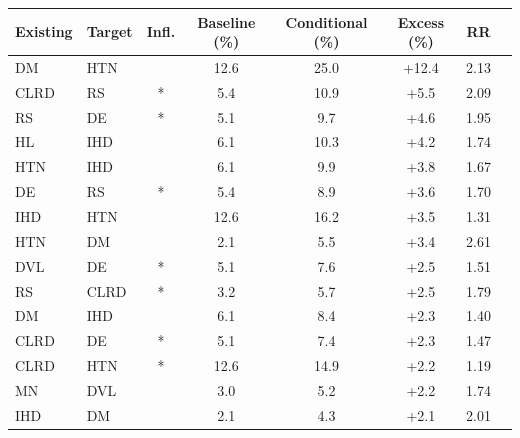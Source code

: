 \begin{tabular}{llcccccc}
\toprule
\textbf{Existing} & \textbf{Target} & \textbf{Infl.} & \textbf{Baseline (\%)} & \textbf{Conditional (\%)} & \textbf{Excess (\%)} & \textbf{RR} \\
\midrule
DM & HTN &  & 12.6 & 25.0 & +12.4 & 2.13 \\
CLRD & RS & * & 5.4 & 10.9 & +5.5 & 2.09 \\
RS & DE & * & 5.1 & 9.7 & +4.6 & 1.95 \\
HL & IHD &  & 6.1 & 10.3 & +4.2 & 1.74 \\
HTN & IHD &  & 6.1 & 9.9 & +3.8 & 1.67 \\
DE & RS & * & 5.4 & 8.9 & +3.6 & 1.70 \\
IHD & HTN &  & 12.6 & 16.2 & +3.5 & 1.31 \\
HTN & DM &  & 2.1 & 5.5 & +3.4 & 2.61 \\
DVL & DE & * & 5.1 & 7.6 & +2.5 & 1.51 \\
RS & CLRD & * & 3.2 & 5.7 & +2.5 & 1.79 \\
DM & IHD &  & 6.1 & 8.4 & +2.3 & 1.40 \\
CLRD & DE & * & 5.1 & 7.4 & +2.3 & 1.47 \\
CLRD & HTN & * & 12.6 & 14.9 & +2.2 & 1.19 \\
MN & DVL &  & 3.0 & 5.2 & +2.2 & 1.74 \\
IHD & DM &  & 2.1 & 4.3 & +2.1 & 2.01 \\
\bottomrule
\end{tabular}
